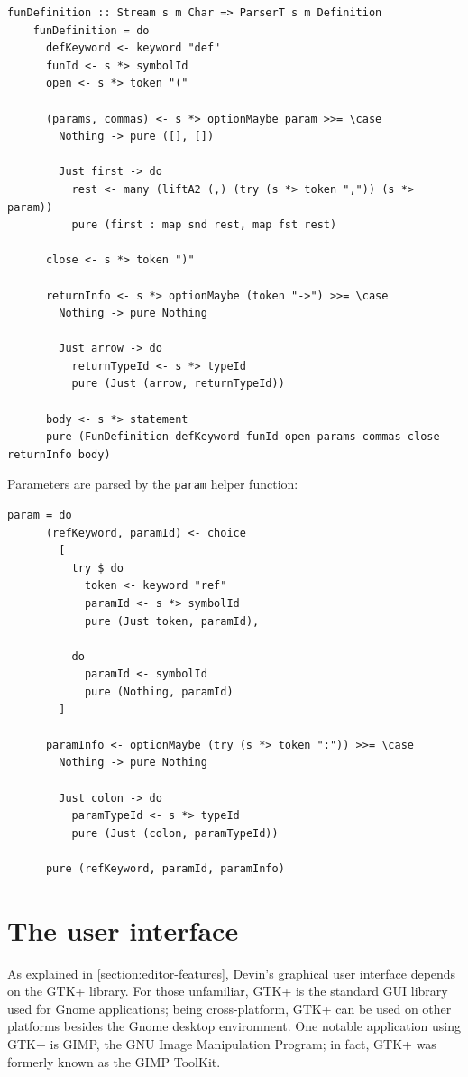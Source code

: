 \documentclass[UdineBachThesis,american,11pt]{PhdThesis}
\begin{document}
  \begin{Verbatim}[gobble=4,fontsize=\small]
    funDefinition :: Stream s m Char => ParserT s m Definition
    funDefinition = do
      defKeyword <- keyword "def"
      funId <- s *> symbolId
      open <- s *> token "("

      (params, commas) <- s *> optionMaybe param >>= \case
        Nothing -> pure ([], [])

        Just first -> do
          rest <- many (liftA2 (,) (try (s *> token ",")) (s *> param))
          pure (first : map snd rest, map fst rest)

      close <- s *> token ")"

      returnInfo <- s *> optionMaybe (token "->") >>= \case
        Nothing -> pure Nothing

        Just arrow -> do
          returnTypeId <- s *> typeId
          pure (Just (arrow, returnTypeId))

      body <- s *> statement
      pure (FunDefinition defKeyword funId open params commas close returnInfo body)
  \end{Verbatim}

  Parameters are parsed by the \mbox{\texttt{param}} helper function:

  \begin{Verbatim}[gobble=4,fontsize=\small]
    param = do
      (refKeyword, paramId) <- choice
        [
          try $ do
            token <- keyword "ref"
            paramId <- s *> symbolId
            pure (Just token, paramId),

          do
            paramId <- symbolId
            pure (Nothing, paramId)
        ]

      paramInfo <- optionMaybe (try (s *> token ":")) >>= \case
        Nothing -> pure Nothing

        Just colon -> do
          paramTypeId <- s *> typeId
          pure (Just (colon, paramTypeId))

      pure (refKeyword, paramId, paramInfo)
  \end{Verbatim}

  \section{The user interface}

  As explained in \autoref{section:editor-features}, Devin's graphical user
  interface depends on the GTK+ library. For those unfamiliar, GTK+ is the
  standard GUI library used for Gnome applications; being cross-platform, GTK+
  can be used on other platforms besides the Gnome desktop environment. One
  notable application using GTK+ is GIMP, the GNU Image Manipulation Program; in
  fact, GTK+ was formerly known as the GIMP ToolKit.
\end{document}
